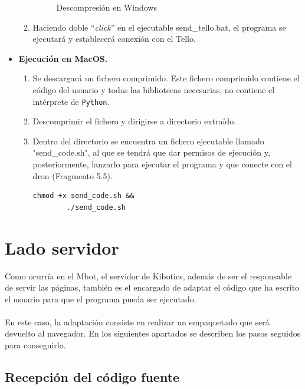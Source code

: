 \documentclass{report}
\begin{document}
\begin{itemize}
\begin{enumerate}
\begin{figure}[h!]
  				\caption{Descompresión en Windows}
  				\label{Descompresión en Windows}
			\end{figure}
			\item Haciendo doble “\textit{click}” en el ejecutable send\_tello.bat, el programa se ejecutará y establecerá conexión con el Tello.
		\end{enumerate}
	\item \textbf{Ejecución en MacOS.}
		\begin{enumerate}
			\item Se descargará un fichero comprimido. Este fichero comprimido contiene el código del usuario y todas las bibliotecas necesarias, no contiene el intérprete de \texttt{Python}.
			\item Descomprimir el fichero y dirigirse a  directorio extraído.
			\item Dentro del directorio se encuentra un fichero ejecutable llamado "send\_code.sh", al que se tendrá que dar permisos de ejecución y, posteriormente, lanzarlo para ejecutar el programa y que conecte con el dron (Fragmento 5.5).			
			\\
			\begin{lstlisting}[frame=single,breaklines=true, label=Comandos para ejecución del envío en MacOS, caption=Comandos para ejecución del envío en MacOS,  captionpos=b]
		chmod +x send_code.sh &&
		./send_code.sh
			\end{lstlisting}
		\end{enumerate}
\end{itemize}



\section{Lado servidor}

Como ocurría en el Mbot, el servidor de Kibotics, además de ser el responsable de servir las páginas, también es el encargado de adaptar el código que ha escrito el usuario para que el programa pueda ser ejecutado. 
\\
\\
En este caso, la adaptación consiste en realizar un empaquetado que será devuelto al navegador. En los siguientes apartados se describen los pasos seguidos para conseguirlo.

\subsection{Recepción del código fuente}
\end{document}
